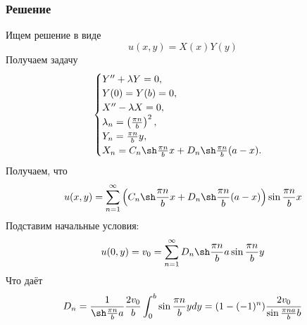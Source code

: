 \documentclass[11pt]{article}
\begin{document}
\subsubsection{Решение}
\label{sec:orge2020b3}
Ищем решение в виде
\begin{equation}
u(x, y) = X(x)Y(y)
\end{equation}
Получаем задачу
\begin{equation}
\begin{cases}
Y'' + \lambda Y = 0, \\
Y(0) = Y(b) = 0, \\
X'' - \lambda X = 0, \\
\lambda_n = \left(\frac{\pi n}b\right)^2, \\
Y_n = \frac{\pi n}by, \\
X_n = C_n\sh\frac{\pi n}bx + D_n\sh\frac{\pi n}b(a - x).
\end{cases}
\end{equation}
Получаем, что
\begin{equation}
u(x, y) = \sum_{n = 1}^{\infty}\left(C_n\sh\frac{\pi n}bx + D_n\sh\frac{\pi n}b(a - x)\right)\sin\frac{\pi n}bx
\end{equation}
Подставим начальные условия:
\begin{equation}
u(0, y) = v_0 = \sum_{n = 1}^{\infty}D_n\sh\frac{\pi n}ba\sin\frac{\pi n}by
\end{equation}
Что даёт
\begin{equation}
D_n = \frac1{\sh\frac{\pi n}ba}\frac{2v_0}b\int_0^b\sin\frac{\pi n}bydy = (1 - (-1)^n)\frac{2v_0}{\sin\frac{\pi na}bb}
\end{equation}
\end{document}
